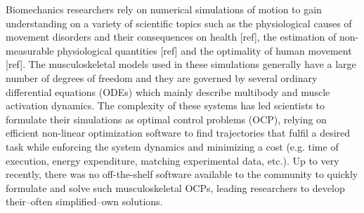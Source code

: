 Biomechanics researchers rely on numerical simulations of motion to gain understanding on a variety of scientific topics such as the physiological causes of movement disorders and their consequences on health [ref], the estimation of non-measurable physiological quantities [ref] and the optimality of human movement [ref].
The musculoskeletal models used in these simulations generally have a large number of degrees of freedom and they are governed by several ordinary differential equations (ODEs) which mainly describe multibody and muscle activation dynamics.
The complexity of these systems has led scientists to formulate their simulations as optimal control problems (OCP), relying on efficient non-linear optimization software to find trajectories that fulfil a desired task while enforcing the system dynamics and minimizing a cost (e.g. time of execution, energy expenditure, matching experimental data, etc.).
Up to very recently, there was no off-the-shelf software available to the community to quickly formulate and solve such musculoskeletal OCPs, leading researchers to develop their--often simplified--own solutions.

